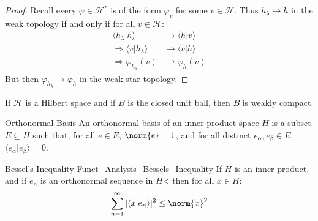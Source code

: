 \documentclass[crop=false,class=book,oneside]{standalone}                      %
\begin{document}
        \begin{proof}
            Recall every $\varphi\in\mathcal{H}^{*}$ is of the
            form $\varphi_{v}$ for some $v\in\mathcal{H}$.
            Thus $h_{\lambda}\mapsto{h}$ in the weak topology
            if and only if for all $v\in\mathcal{H}$:
            \begin{subequations}
                \begin{align}
                    \langle{h_{\lambda}|h}\rangle
                    &\rightarrow\langle{h|v}\rangle\\
                    \Longrightarrow
                    \langle{v|h_{\lambda}}\rangle
                    &\rightarrow\langle{v|h}\rangle\\
                    \Longrightarrow\varphi_{h_{\lambda}}(v)
                    &\rightarrow\varphi_{h}(v)
                \end{align}
            \end{subequations}
            But then $\varphi_{h_{\lambda}}\rightarrow\varphi_{h}$
            in the weak star topology.
        \end{proof}
        \begin{theorem}
            If $\mathcal{H}$ is a Hilbert space and if
            $B$ is the closed unit ball, then $B$ is
            weakly compact.
        \end{theorem}
        \begin{ldefinition}{Orthonormal Basis}
            An orthonormal basis of an inner product
            space $H$ is a subset $E\subseteq{H}$ such that, for
            all $e\in{E}$, $\norm{e}=1$, and for all distinct
            $e_{\alpha},e_{\beta}\in{E}$,
            $\langle{e_{\alpha}|e_{\beta}}\rangle=0$.
        \end{ldefinition}
        \begin{ltheorem}{Bessel's Inequality}
              {Funct_Analysis_Bessels_Inequality}
            If $H$ is an inner product, and if
            $e_{n}$ is an orthonormal sequence in $H$< then
            for all $x\in{H}$:
            \begin{equation}
                \sum_{n=1}^{\infty}|\langle{x|e_{n}}\rangle|^{2}
                    \leq\norm{x}^{2}
            \end{equation}
        \end{ltheorem}
\end{document}
